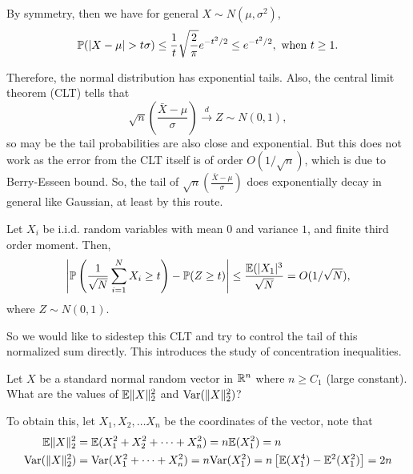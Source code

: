 \documentclass[12pt]{article}
\begin{document}
By symmetry, then we have for general $X \sim N(\mu, \sigma^2)$,
\begin{equation*}
    \mathbb{P}(\vert X -\mu \vert > t\sigma) \leq \dfrac{1}{t}\sqrt{\dfrac{2}{\pi}} e^{-t^2/2} \leq e^{-t^2/2}, \text{ when } t \geq 1.
\end{equation*}

Therefore, the normal distribution has exponential tails.  Also, the central limit theorem (CLT) tells that
\begin{equation*}
    \sqrt{n} \left(\frac{\bar{X} - \mu}{\sigma}\right) \xrightarrow{d} Z \sim N(0,1),
\end{equation*}
\noindent so may be the tail probabilities are also close and exponential. But this does not work as the error from the CLT itself is of order $O(1/\sqrt{n})$, which is due to Berry-Esseen bound. So, the tail of $\sqrt{n} \left(\frac{\bar{X} - \mu}{\sigma}\right)$ does exponentially decay in general like Gaussian, at least by this route.

\begin{theorembox}
    Let $X_i$ be i.i.d. random variables with mean $0$ and variance $1$, and finite third order moment. Then,
    \begin{equation*}
        \left\vert \mathbb{P}\left( \dfrac{1}{\sqrt{N}}\sum_{i=1}^N X_i \geq t \right) - \mathbb{P}(Z \geq t) \right\vert \leq \dfrac{\mathbb{E}(\vert X_1\vert^3}{\sqrt{N}} = O(1/\sqrt{N}),
    \end{equation*}
    \noindent where $Z \sim N(0, 1)$.
\end{theorembox}

\noindent So we would like to sidestep this CLT and try to control the tail of this normalized sum directly. This introduces the study of concentration inequalities.

\begin{exercisebox}
    Let $X$ be a standard normal random vector in $\mathbb{R}^n$ where $n \geq C_1$ (large constant). What are the values of $\mathbb{E}\Vert X\Vert_2^2$ and $\mathrm{Var}(\Vert X\Vert_2^2)$?

    To obtain this, let $X_1, X_2, \dots X_n$ be the coordinates of the vector, note that
    \begin{align*}
        \mathbb{E}\Vert X\Vert_2^2     & = \mathbb{E}(X_1^2 + X_2^2 + \dots + X_n^2) = n \mathbb{E}(X_1^2) = n                                       \\
        \mathrm{Var}(\Vert X\Vert_2^2) & = \mathrm{Var}(X_1^2 + \dots + X_n^2) = n\mathrm{Var}(X_1^2) = n\left[ \mathbb{E}(X_1^4) - \mathbb{E}^2(X_1^2) \right] = 2n
    \end{align*}
\end{exercisebox}
\end{document}
